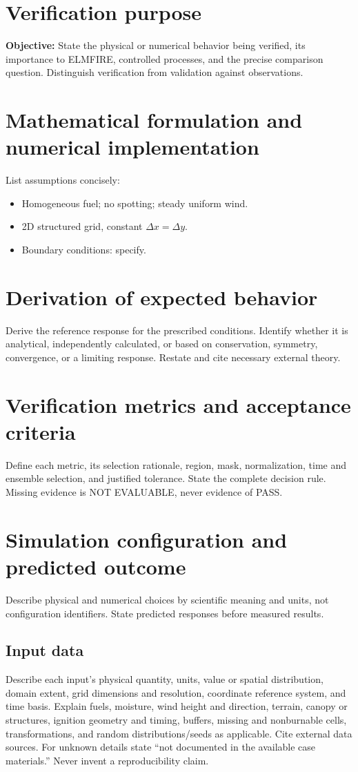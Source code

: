 \documentclass[../report/case_report.tex]{subfiles}
\begin{document}
\section{Verification purpose}
\textbf{Objective:} State the physical or numerical behavior being verified,
its importance to ELMFIRE, controlled processes, and the precise comparison
question. Distinguish verification from validation against observations.


\section{Mathematical formulation and numerical implementation}
List assumptions concisely:
\begin{itemize}[nosep]
\item Homogeneous fuel; no spotting; steady uniform wind.
\item 2D structured grid, constant \(\Delta x = \Delta y\).
\item Boundary conditions: specify.
\end{itemize}


\section{Derivation of expected behavior}
Derive the reference response for the prescribed conditions. Identify whether
it is analytical, independently calculated, or based on conservation, symmetry,
convergence, or a limiting response. Restate and cite necessary external theory.

\section{Verification metrics and acceptance criteria}
Define each metric, its selection rationale, region, mask, normalization, time
and ensemble selection, and justified tolerance. State the complete decision
rule. Missing evidence is NOT EVALUABLE, never evidence of PASS.

\section{Simulation configuration and predicted outcome}
Describe physical and numerical choices by scientific meaning and units, not
configuration identifiers. State predicted responses before measured results.


\subsection{Input data}
Describe each input's physical quantity, units, value or spatial distribution,
domain extent, grid dimensions and resolution, coordinate reference system,
and time basis. Explain fuels, moisture, wind height and direction, terrain,
canopy or structures, ignition geometry and timing, buffers, missing and
nonburnable cells, transformations, and random distributions/seeds as applicable.
Cite external data sources. For unknown details state ``not documented in the
available case materials.'' Never invent a reproducibility claim.
\end{document}
